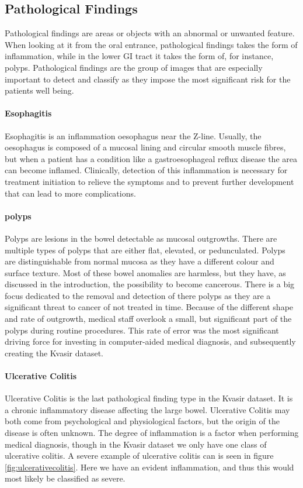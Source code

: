 \subsection{Pathological Findings}
Pathological findings are areas or objects with an abnormal or unwanted feature. When looking at it from the oral entrance, pathological findings takes the form of inflammation, while in the lower GI tract it takes the form of, for instance, polyps. 
Pathological findings are the group of images that are especially important to detect and classify as they impose the most significant risk for the patients well being. 


\paragraph{Esophagitis}
Esophagitis is an inflammation oesophagus near the Z-line. Usually, the oesophagus is composed of a mucosal lining and circular smooth muscle fibres, but when a patient has a condition like a gastroesophageal reflux disease the area can become inflamed. 
Clinically, detection of this inflammation is necessary for treatment initiation to relieve the symptoms and to prevent further development that can lead to more complications.


\paragraph{polyps}
Polyps are lesions in the bowel detectable as mucosal outgrowths. There are multiple types of polyps that are either flat, elevated, or pedunculated. Polyps are distinguishable from normal mucosa as they have a different colour and surface texture. Most of these bowel anomalies are harmless, but they have, as discussed in the introduction, the possibility to become cancerous. 
There is a big focus dedicated to the removal and detection of there polyps as they are a significant threat to cancer of not treated in time. Because of the different shape and rate of outgrowth, medical staff overlook a small, but significant part of the polyps during routine procedures. 
This rate of error was the most significant driving force for investing in computer-aided medical diagnosis, and subsequently creating the Kvasir dataset.

\paragraph{Ulcerative Colitis}
Ulcerative Colitis is the last pathological finding type in the Kvasir dataset. 
It is a chronic inflammatory disease affecting the large bowel. Ulcerative Colitis may both come from psychological and physiological factors, but the origin of the disease is often unknown. The degree of inflammation is a factor when performing medical diagnosis, though in the Kvasir dataset we only have one class of ulcerative colitis.
A severe example of ulcerative colitis can is seen in figure \ref{fig:ulcerativecolitis}. Here we have an evident inflammation, and thus this would most likely be classified as severe.



